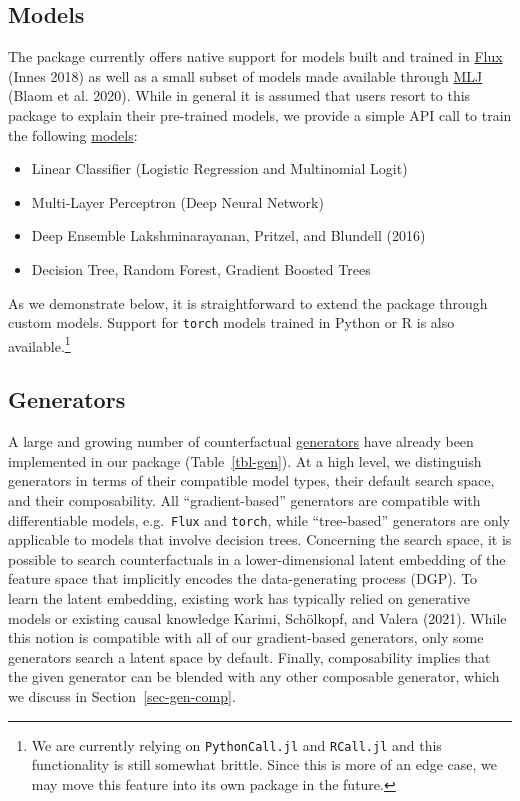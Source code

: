 \documentclass{juliacon}
\providecommand{\tightlist}{%
  \setlength{\itemsep}{0pt}\setlength{\parskip}{0pt}}\usepackage{longtable,booktabs,array}
\begin{document}
\hypertarget{models}{%
\subsection{Models}\label{models}}

The package currently offers native support for models built and trained
in \href{https://fluxml.ai/}{Flux} (Innes 2018) as well as a small
subset of models made available through
\href{https://alan-turing-institute.github.io/MLJ.jl/dev/}{MLJ} (Blaom
et al. 2020). While in general it is assumed that users resort to this
package to explain their pre-trained models, we provide a simple API
call to train the following
\href{https://juliatrustworthyai.github.io/CounterfactualExplanations.jl/v0.1/tutorials/model_catalogue/}{models}:

\begin{itemize}
\tightlist
\item
  Linear Classifier (Logistic Regression and Multinomial Logit)
\item
  Multi-Layer Perceptron (Deep Neural Network)
\item
  Deep Ensemble Lakshminarayanan, Pritzel, and Blundell (2016)
\item
  Decision Tree, Random Forest, Gradient Boosted Trees
\end{itemize}

As we demonstrate below, it is straightforward to extend the package
through custom models. Support for \texttt{torch} models trained in
Python or R is also available.\footnote{We are currently relying on
  \texttt{PythonCall.jl} and \texttt{RCall.jl} and this functionality is
  still somewhat brittle. Since this is more of an edge case, we may
  move this feature into its own package in the future.}

\hypertarget{sec-gen}{%
\subsection{Generators}\label{sec-gen}}

A large and growing number of counterfactual
\href{https://juliatrustworthyai.github.io/CounterfactualExplanations.jl/v0.1/explanation/generators/overview/}{generators}
have already been implemented in our package (Table~\ref{tbl-gen}). At a
high level, we distinguish generators in terms of their compatible model
types, their default search space, and their composability. All
``gradient-based'' generators are compatible with differentiable models,
e.g.~\texttt{Flux} and \texttt{torch}, while ``tree-based'' generators
are only applicable to models that involve decision trees. Concerning
the search space, it is possible to search counterfactuals in a
lower-dimensional latent embedding of the feature space that implicitly
encodes the data-generating process (DGP). To learn the latent
embedding, existing work has typically relied on generative models or
existing causal knowledge Karimi, Schölkopf, and Valera (2021). While
this notion is compatible with all of our gradient-based generators,
only some generators search a latent space by default. Finally,
composability implies that the given generator can be blended with any
other composable generator, which we discuss in
Section~\ref{sec-gen-comp}.
\end{document}
